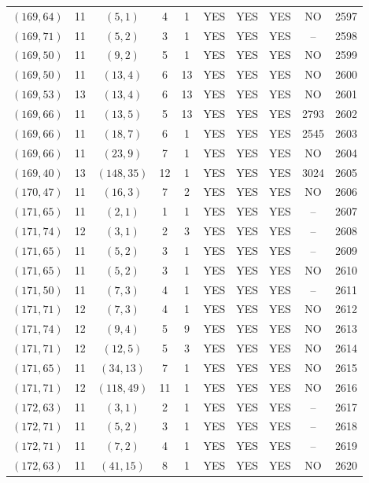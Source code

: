 \begin{longtable}{|c|c|c|c|c|c|c|c|c|c|}
$(169, 64)$ & 11 & $(5, 1)$ & 4 & 1 & YES & YES & YES & NO & 2597\\
$(169, 71)$ & 11 & $(5, 2)$ & 3 & 1 & YES & YES & YES & -- & 2598\\
$(169, 50)$ & 11 & $(9, 2)$ & 5 & 1 & YES & YES & YES & NO & 2599\\
$(169, 50)$ & 11 & $(13, 4)$ & 6 & 13 & YES & YES & YES & NO & 2600\\
$(169, 53)$ & 13 & $(13, 4)$ & 6 & 13 & YES & YES & YES & NO & 2601\\
$(169, 66)$ & 11 & $(13, 5)$ & 5 & 13 & YES & YES & YES & 2793 & 2602\\
$(169, 66)$ & 11 & $(18, 7)$ & 6 & 1 & YES & YES & YES & 2545 & 2603\\
$(169, 66)$ & 11 & $(23, 9)$ & 7 & 1 & YES & YES & YES & NO & 2604\\
$(169, 40)$ & 13 & $(148, 35)$ & 12 & 1 & YES & YES & YES & 3024 & 2605\\
$(170, 47)$ & 11 & $(16, 3)$ & 7 & 2 & YES & YES & YES & NO & 2606\\
$(171, 65)$ & 11 & $(2, 1)$ & 1 & 1 & YES & YES & YES & -- & 2607\\
$(171, 74)$ & 12 & $(3, 1)$ & 2 & 3 & YES & YES & YES & -- & 2608\\
$(171, 65)$ & 11 & $(5, 2)$ & 3 & 1 & YES & YES & YES & -- & 2609\\
$(171, 65)$ & 11 & $(5, 2)$ & 3 & 1 & YES & YES & YES & NO & 2610\\
$(171, 50)$ & 11 & $(7, 3)$ & 4 & 1 & YES & YES & YES & -- & 2611\\
$(171, 71)$ & 12 & $(7, 3)$ & 4 & 1 & YES & YES & YES & NO & 2612\\
$(171, 74)$ & 12 & $(9, 4)$ & 5 & 9 & YES & YES & YES & NO & 2613\\
$(171, 71)$ & 12 & $(12, 5)$ & 5 & 3 & YES & YES & YES & NO & 2614\\
$(171, 65)$ & 11 & $(34, 13)$ & 7 & 1 & YES & YES & YES & NO & 2615\\
$(171, 71)$ & 12 & $(118, 49)$ & 11 & 1 & YES & YES & YES & NO & 2616\\
$(172, 63)$ & 11 & $(3, 1)$ & 2 & 1 & YES & YES & YES & -- & 2617\\
$(172, 71)$ & 11 & $(5, 2)$ & 3 & 1 & YES & YES & YES & -- & 2618\\
$(172, 71)$ & 11 & $(7, 2)$ & 4 & 1 & YES & YES & YES & -- & 2619\\
$(172, 63)$ & 11 & $(41, 15)$ & 8 & 1 & YES & YES & YES & NO & 2620\\

\end{longtable}
